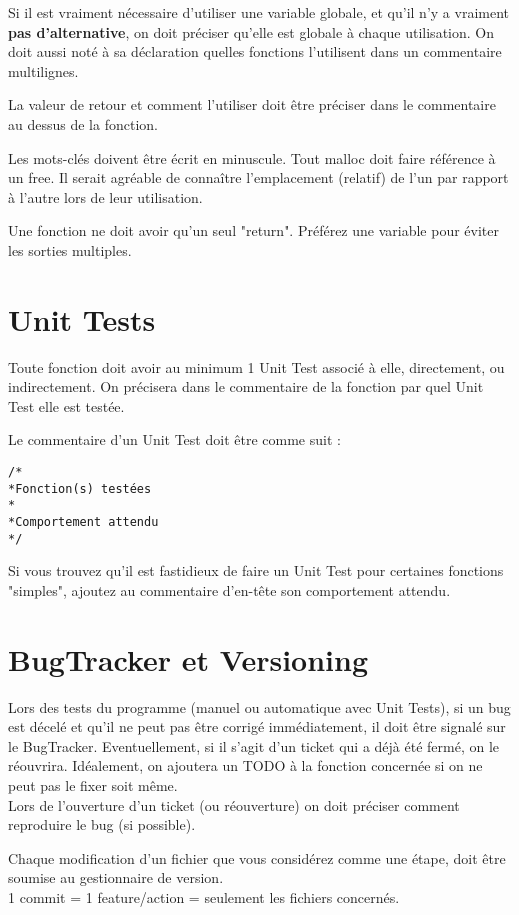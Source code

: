 \documentclass[a4paper, titlepage, oneside]{book}
\begin{document}
Si il est vraiment nécessaire d'utiliser une variable globale, et qu'il n'y a vraiment \textbf{pas d'alternative}, on doit préciser qu'elle est globale à chaque utilisation. On doit aussi noté à sa déclaration quelles fonctions l'utilisent dans un commentaire multilignes.

La valeur de retour et comment l'utiliser doit être préciser dans le commentaire au dessus de la fonction.

Les mots-clés doivent être écrit en minuscule. Tout malloc doit faire référence à un free. Il serait agréable de connaître l'emplacement (relatif) de l'un par rapport à l'autre lors de leur utilisation.

Une fonction ne doit avoir qu'un seul "return". Préférez une variable pour éviter les sorties multiples.

\chapter{Unit Tests}

Toute fonction doit avoir au minimum 1 Unit Test associé à elle, directement, ou indirectement. On précisera dans le commentaire de la fonction par quel Unit Test elle est testée.

Le commentaire d'un Unit Test doit être comme suit :

\begin{verbatim}
/*
*Fonction(s) testées
*
*Comportement attendu
*/
\end{verbatim}

Si vous trouvez qu'il est fastidieux de faire un Unit Test pour certaines fonctions "simples", ajoutez au commentaire d'en-tête son comportement attendu.

\chapter{BugTracker et Versioning}

Lors des tests du programme (manuel ou automatique avec Unit Tests), si un bug est décelé et qu'il ne peut pas être corrigé immédiatement, il doit être signalé sur le BugTracker. Eventuellement, si il s'agit d'un ticket qui a déjà été fermé, on le réouvrira. Idéalement, on ajoutera un TODO à la fonction concernée si on ne peut pas le fixer soit même.\\
Lors de l'ouverture d'un ticket (ou réouverture) on doit préciser comment reproduire le bug (si possible).

Chaque modification d'un fichier que vous considérez comme une étape, doit être soumise au gestionnaire de version.\\
1 commit = 1 feature/action = seulement les fichiers concernés.
\end{document}
